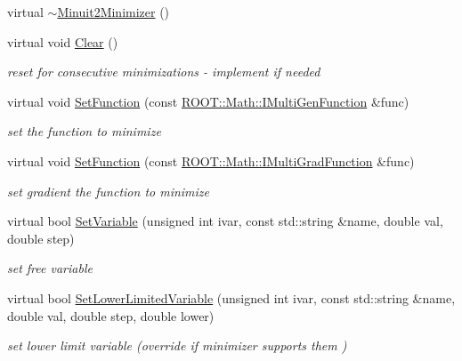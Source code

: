 \begin{DoxyCompactItemize}
\item 
virtual \mbox{\hyperlink{classROOT_1_1Minuit2_1_1Minuit2Minimizer_ac46ec7e45b826edeeee858208bf9b01f}{$\sim$\+Minuit2\+Minimizer}} ()
\item 
virtual void \mbox{\hyperlink{classROOT_1_1Minuit2_1_1Minuit2Minimizer_a11e6ce9a4285080548f9855b78ca83b4}{Clear}} ()
\begin{DoxyCompactList}\small\item\em reset for consecutive minimizations -\/ implement if needed \end{DoxyCompactList}\item 
virtual void \mbox{\hyperlink{classROOT_1_1Minuit2_1_1Minuit2Minimizer_ae18efc66a943fe11b1114ff8c1b28ad0}{Set\+Function}} (const \mbox{\hyperlink{namespaceROOT_1_1Math_aec22897f3d759f7c284893c81d980799}{R\+O\+O\+T\+::\+Math\+::\+I\+Multi\+Gen\+Function}} \&func)
\begin{DoxyCompactList}\small\item\em set the function to minimize \end{DoxyCompactList}\item 
virtual void \mbox{\hyperlink{classROOT_1_1Minuit2_1_1Minuit2Minimizer_aeb98c40cf3486fe8fb9bec4da0f7942e}{Set\+Function}} (const \mbox{\hyperlink{namespaceROOT_1_1Math_a014e019aaf9304a00e9231bd9ed232fb}{R\+O\+O\+T\+::\+Math\+::\+I\+Multi\+Grad\+Function}} \&func)
\begin{DoxyCompactList}\small\item\em set gradient the function to minimize \end{DoxyCompactList}\item 
virtual bool \mbox{\hyperlink{classROOT_1_1Minuit2_1_1Minuit2Minimizer_a951ad856f74ded3c64836fa28fdf9bb5}{Set\+Variable}} (unsigned int ivar, const std\+::string \&name, double val, double step)
\begin{DoxyCompactList}\small\item\em set free variable \end{DoxyCompactList}\item 
virtual bool \mbox{\hyperlink{classROOT_1_1Minuit2_1_1Minuit2Minimizer_af38926946e36f7030cfc1c298ab9b222}{Set\+Lower\+Limited\+Variable}} (unsigned int ivar, const std\+::string \&name, double val, double step, double lower)
\begin{DoxyCompactList}\small\item\em set lower limit variable (override if minimizer supports them ) \end{DoxyCompactList}\item 

\end{DoxyCompactItemize}
